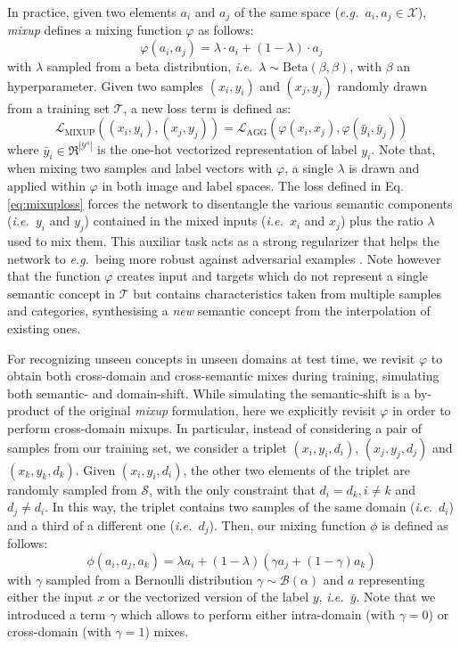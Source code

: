 \documentclass[runningheads]{llncs}
\newcommand{\eg}{\emph{e.g.~}}
\newcommand{\ie}{\emph{i.e.~}}
\begin{document}
In practice, given two elements $a_i$ and $a_j$ of the same space (\eg $a_i,a_j\in\mathcal{X}$), \textit{mixup} \cite{zhang2017mixup} defines a mixing function $\varphi$ as follows: 
\begin{equation}
    \label{eq:phi-mixup}
    \varphi(a_i,a_j) =\lambda\cdot a_i + (1-\lambda) \cdot a_j
\end{equation}
with $\lambda$ sampled from a beta distribution, \ie $\lambda\sim \text{Beta}(\beta,\beta)$, with $\beta$ an hyperparameter. Given two samples $(x_i,y_i)$ and $(x_j,y_j)$ randomly drawn from a training set $\mathcal{T}$, a new loss term is defined as:
\begin{equation}
    \label{eq:mixuploss}
    \mathcal{L}_{\text{MIXUP}}((x_i,y_i),(x_j,y_j)) = \mathcal{L}_{\text{AGG}}(\varphi(x_i,x_j),\varphi(\bar{y}_i,\bar{y}_j))
\end{equation}
where $\bar{y}_i\in \Re^{|\mathcal{Y}^s|}$ is the one-hot vectorized representation of label $y_i$. Note that, when mixing two samples and label vectors with $\varphi$, a single $\lambda$ is drawn and applied within $\varphi$ in both image and label spaces. The loss defined in Eq.\eqref{eq:mixuploss} forces the network to disentangle the various semantic components (\ie $y_i$ and $y_j$) contained in the mixed inputs (\ie $x_i$ and $x_j$) plus the ratio $\lambda$ used to mix them.
This auxiliar task acts as a strong regularizer that helps the network to \eg being more robust against adversarial examples \cite{zhang2017mixup}. Note however that the function $\varphi$ creates input and targets which {do not represent} a single semantic concept in $\mathcal{T}$ but contains characteristics taken from multiple samples and categories, synthesising a \textit{new} semantic concept from the interpolation of existing ones. 

For recognizing unseen concepts in unseen domains at test time, we revisit $\varphi$ to obtain both cross-domain and cross-semantic mixes during training, simulating both semantic- and domain-shift. While simulating the semantic-shift is a by-product of the original \textit{mixup} formulation, here we explicitly revisit $\varphi$ in order to perform cross-domain mixups. In particular, instead of considering a pair of samples from our training set, we consider a triplet $(x_i,y_i,d_i)$, $(x_j,y_j,d_j)$ and $(x_k,y_k,d_k)$. Given $(x_i,y_i,d_i)$, the other two elements of the triplet are randomly sampled from $\mathcal{S}$, with the only constraint that $d_i=d_k,i\neq k$ and $d_j\neq d_i$. In this way, the triplet contains two samples of the same domain (\ie $d_i$) and a third of a different one (\ie $d_j$). Then, our mixing function $\phi$ is defined as follows: 
\begin{equation}
    \label{eq:our-phi}
    \phi(a_i,a_j,a_k) = \lambda a_i + (1-\lambda)( \gamma a_j + (1-\gamma) a_k)
\end{equation}
with $\gamma$ sampled from a Bernoulli distribution $\gamma \sim \mathcal{B}(\alpha)$ and $a$ representing either the input $x$ or the vectorized version of the label $y$, \ie $\bar{y}$. Note that we introduced a term $\gamma$ which allows to perform either intra-domain (with $\gamma=0$) or cross-domain (with $\gamma=1$) mixes.  
\end{document}
